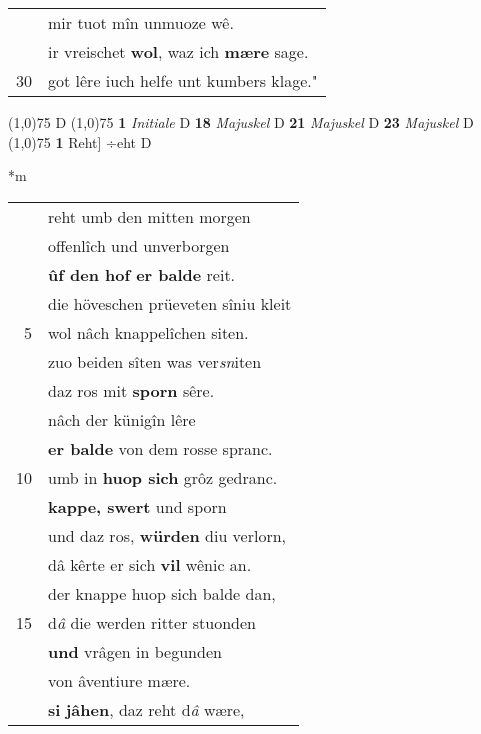 \documentclass[8pt,a4paper,notitlepage]{article}
\begin{document}
\begin{table}[ht]
\begin{minipage}[t]{0.5\linewidth}
\begin{tabular}{rl}
 & mir tuot mîn unmuoze wê.\\ 
 & ir vreischet \textbf{wol}, waz ich \textbf{mære} sage.\\ 
30 & got lêre iuch helfe unt kumbers klage."\\ 
\end{tabular}
\scriptsize
\line(1,0){75} \newline
D \newline
\line(1,0){75} \newline
\textbf{1} \textit{Initiale} D  \textbf{18} \textit{Majuskel} D  \textbf{21} \textit{Majuskel} D  \textbf{23} \textit{Majuskel} D  \newline
\line(1,0){75} \newline
\textbf{1} Reht] ÷eht D \newline
\end{minipage}
\hspace{0.5cm}
\begin{minipage}[t]{0.5\linewidth}
\small
\begin{center}*m
\end{center}
\begin{tabular}{rl}
 & reht umb den mitten morgen\\ 
 & offenlîch und unverborgen\\ 
 & \textbf{ûf den hof er balde} reit.\\ 
 & die höveschen prüeveten sîniu kleit\\ 
5 & wol nâch knappelîchen siten.\\ 
 & zuo beiden sîten was ver\textit{sn}iten\\ 
 & daz ros mit \textbf{sporn} sêre.\\ 
 & nâch der künigîn lêre\\ 
 & \textbf{er balde} von dem rosse spranc.\\ 
10 & umb in \textbf{huop sich} grôz gedranc.\\ 
 & \textbf{kappe, swert} und sporn\\ 
 & und daz ros, \textbf{würden} diu verlorn,\\ 
 & dâ kêrte er sich \textbf{vil} wênic an.\\ 
 & der knappe huop sich balde dan,\\ 
15 & d\textit{â} die werden ritter stuonden\\ 
 & \textbf{und} vrâgen in begunden\\ 
 & von âventiure mære.\\ 
 & \textbf{si} \textbf{jâhen}, daz reht d\textit{â} wære,\\ 

\end{tabular}
\end{minipage}
\end{table}
\end{document}
